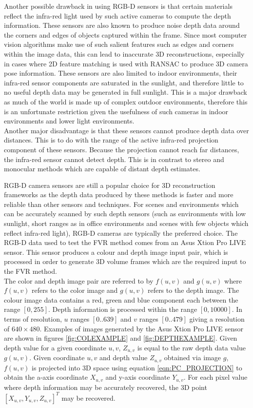 Another possible drawback in using RGB-D sensors is that certain materials reflect the infra-red light used by such active cameras to compute the depth information. These sensors are also known to produce noise depth data around the corners and edges of objects captured within the frame. Since most computer vision algorithms make use of such salient features such as edges and corners within the image data, this can lead to inaccurate 3D reconstructions, especially in cases where 2D feature matching is used with RANSAC to produce 3D camera pose information. These sensors are also limited to indoor environments, their infra-red sensor components are saturated in the sunlight, and therefore little to no useful depth data may be generated in full sunlight. This is a major drawback as much of the world is made up of complex outdoor environments, therefore this is an unfortunate restriction given the usefulness of such cameras in indoor environments and lower light environments. \\

Another major disadvantage is that these sensors cannot produce depth data over distances. This is to do with the range of the active infra-red projection component of these sensors. Because the projection cannot reach far distances, the infra-red sensor cannot detect depth. This is in contrast to stereo and monocular methods which are capable of distant depth estimates.  

RGB-D camera sensors are still a popular choice for 3D reconstruction frameworks as the depth data produced by these methods is faster and more reliable than other sensors and techniques. For scenes and environments which can be accurately scanned by such depth sensors (such as environments with low sunlight, short ranges as in office environments and scenes with few objects which reflect infra-red light), RGB-D cameras are typically the preferred choice. The RGB-D data used to test the FVR method comes from an Asus Xtion Pro LIVE sensor. This sensor produces a colour and depth image input pair, which is processed in order to generate 3D volume frames which are the required input to the FVR method. \\

The color and depth image pair are referred to by $f(u,v)$ and $g(u,v)$ where $f(u,v)$ refers to the color image and $g(u,v)$ refers to the depth image. The colour image data contains a red, green and blue component each between the range $[0,255]$. Depth information is processed within the range $[0,10000]$. In terms of resolution, $u$ ranges $[0..639]$ and $v$ ranges $[0..479]$ giving a resolution of $640 \times 480$. Examples of images generated by the Asus Xtion Pro LIVE sensor are shown in figures \ref{fig:COLEXAMPLE} and \ref{fig:DEPTHEXAMPLE}. Given depth value for a given coordinate $u,v$, $Z_{u,v}$ is equal to the raw depth data value $g(u,v)$. Given coordinate $u,v$ and depth value $Z_{u,v}$ obtained via image $g$, $f(u,v)$ is projected into 3D space using equation \ref{eqn:PC_PROJECTION} to obtain the a-axis coordinate $X_{u,v}$ and y-axis coordinate $Y_{u,v}$. For each pixel value where depth information may be accurately recovered, the 3D point $[X_{u,v}, Y_{u,v}, Z_{u,v}]^T$ may be recovered. \\

